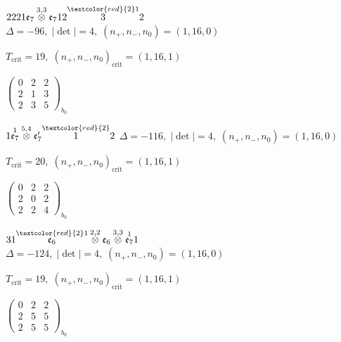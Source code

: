 \documentclass[10pt]{article}
\begin{document}
$2221\mathfrak{e}_7\overset{3,3}{\otimes}\mathfrak{e}_712\overset{\textcolor{red}{2}1}{3}2$ \quad $\Delta=-96,\; |\det|=4,\; (n_+,n_-,n_0)=(1,16,0)$

\hspace{1em}$T_{\text{crit}}=19,\; (n_+,n_-,n_0)_{\text{crit}}=(1,16,1)$

\hspace{2em}$\left(\begin{smallmatrix}0 & 2 & 2 \\ 2 & 1 & 3 \\ 2 & 3 & 5\end{smallmatrix}\right)_{\!b_0}$

\smallskip

$1\overset{1}{\mathfrak{e}_7}\overset{5,4}{\otimes}\mathfrak{e}_7'\overset{\textcolor{red}{2}}{1}2$ \quad $\Delta=-116,\; |\det|=4,\; (n_+,n_-,n_0)=(1,16,0)$

\hspace{1em}$T_{\text{crit}}=20,\; (n_+,n_-,n_0)_{\text{crit}}=(1,16,1)$

\hspace{2em}$\left(\begin{smallmatrix}0 & 2 & 2 \\ 2 & 0 & 2 \\ 2 & 2 & 4\end{smallmatrix}\right)_{\!b_0}$

\smallskip

$31\overset{\textcolor{red}{2}1}{\mathfrak{e}_6}\overset{2,2}{\otimes}\mathfrak{e}_6\overset{3,3}{\otimes}\overset{1}{\mathfrak{e}_7}1$ \quad $\Delta=-124,\; |\det|=4,\; (n_+,n_-,n_0)=(1,16,0)$

\hspace{1em}$T_{\text{crit}}=19,\; (n_+,n_-,n_0)_{\text{crit}}=(1,16,1)$

\hspace{2em}$\left(\begin{smallmatrix}0 & 2 & 2 \\ 2 & 5 & 5 \\ 2 & 5 & 5\end{smallmatrix}\right)_{\!b_0}$

\smallskip
\end{document}
